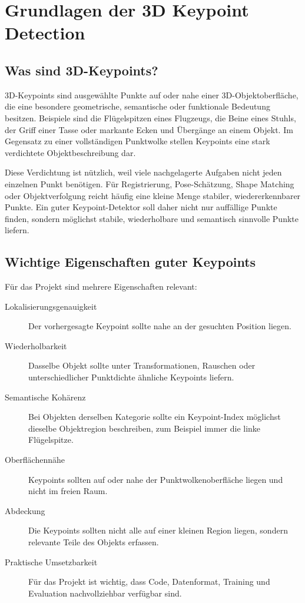 \documentclass[11pt,a4paper]{article}
\begin{document}
\section{Grundlagen der 3D Keypoint Detection}

\subsection{Was sind 3D-Keypoints?}

3D-Keypoints sind ausgewählte Punkte auf oder nahe einer 3D-Objektoberfläche, die eine besondere geometrische, semantische oder funktionale Bedeutung besitzen. Beispiele sind die Flügelspitzen eines Flugzeugs, die Beine eines Stuhls, der Griff einer Tasse oder markante Ecken und Übergänge an einem Objekt. Im Gegensatz zu einer vollständigen Punktwolke stellen Keypoints eine stark verdichtete Objektbeschreibung dar.

Diese Verdichtung ist nützlich, weil viele nachgelagerte Aufgaben nicht jeden einzelnen Punkt benötigen. Für Registrierung, Pose-Schätzung, Shape Matching oder Objektverfolgung reicht häufig eine kleine Menge stabiler, wiedererkennbarer Punkte. Ein guter Keypoint-Detektor soll daher nicht nur auffällige Punkte finden, sondern möglichst stabile, wiederholbare und semantisch sinnvolle Punkte liefern.

\subsection{Wichtige Eigenschaften guter Keypoints}

Für das Projekt sind mehrere Eigenschaften relevant:

\begin{description}
    \item[Lokalisierungsgenauigkeit] Der vorhergesagte Keypoint sollte nahe an der gesuchten Position liegen.
    \item[Wiederholbarkeit] Dasselbe Objekt sollte unter Transformationen, Rauschen oder unterschiedlicher Punktdichte ähnliche Keypoints liefern.
    \item[Semantische Kohärenz] Bei Objekten derselben Kategorie sollte ein Keypoint-Index möglichst dieselbe Objektregion beschreiben, zum Beispiel immer die linke Flügelspitze.
    \item[Oberflächennähe] Keypoints sollten auf oder nahe der Punktwolkenoberfläche liegen und nicht im freien Raum.
    \item[Abdeckung] Die Keypoints sollten nicht alle auf einer kleinen Region liegen, sondern relevante Teile des Objekts erfassen.
    \item[Praktische Umsetzbarkeit] Für das Projekt ist wichtig, dass Code, Datenformat, Training und Evaluation nachvollziehbar verfügbar sind.
\end{description}
\end{document}
